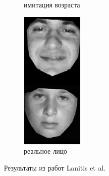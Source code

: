\begin{figure}[t]
\begin{subfigure}[t]{0.2\textwidth}
		\caption{имитация возраста}
	\end{subfigure}
	\begin{subfigure}[t]{0.2\textwidth}
		\includegraphics[width=\textwidth]{gandhi/lanitis3.png}
		\caption{реальное лицо}
	\end{subfigure}
	\caption{Результаты из работ Lanitis et al. \cite{lanitis2}}
	\label{fig:lanitis}
\end{figure}

